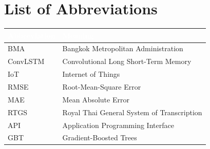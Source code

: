 \chapter*{List of Abbreviations}
\begin{center}
\renewcommand{\arraystretch}{1.3}
\begin{tabularx}{\textwidth}{@{}l X@{}}
\toprule
\rowcolor{chulapink}
\textcolor{white}{\textbf{Abbreviation}} & \textcolor{white}{\textbf{Meaning}} \\
\midrule
BMA & Bangkok Metropolitan Administration \\
ConvLSTM & Convolutional Long Short-Term Memory \\
IoT & Internet of Things \\
RMSE & Root-Mean-Square Error \\
MAE & Mean Absolute Error \\
RTGS & Royal Thai General System of Transcription \\
API & Application Programming Interface \\
GBT & Gradient-Boosted Trees \\
\bottomrule
\end{tabularx}
\end{center}

\setcounter{page}{1}

